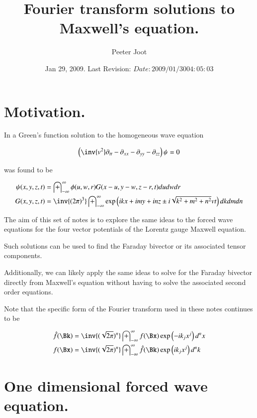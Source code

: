 \documentclass{article}
\title{ Fourier transform solutions to Maxwell's equation. }
\author{Peeter Joot}
\date{ Jan 29, 2009.  Last Revision: $Date: 2009/01/30 04:05:03 $ }
\newcommand{\IIinf}[0]{ \int_{-\infty}^\infty }
\begin{document}
\maketitle{}

\tableofcontents
\section{ Motivation. }

In \cite{PJwaveFourier} a Green's function solution to the homogeneous 
wave equation

\begin{align}\label{eqn:wave}
\left(\inv{v^2} \partial_{tt} -\partial_{xx} -\partial_{yy} -\partial_{zz} \right)\psi = 0 
\end{align}

was found to be

\begin{align}\label{eqn:greensSolution3d}
{\psi}(x,y,z,t) &= \IIinf \phi(u,w,r) G( x-u, y-w, z-r, t) du dw dr \\
G(x,y,z,t) &= \inv{({2\pi})^3} \IIinf \exp\left( i k x + i m y + i n z \pm i \sqrt{k^2 + m^2 + n^2} v t \right) dk dm dn
\end{align}

The aim of this set of notes is to explore the same ideas to the forced wave
equations for the four vector potentials of the Lorentz gauge Maxwell equation.

Such solutions can be used to find the Faraday bivector or its associated
tensor components.

Additionally, we can likely apply the same ideas to solve for the Faraday
bivector directly from Maxwell's equation without having to solve the 
associated second order equations.

Note that the specific form of the Fourier transform used in these notes continues to be

\begin{align}
\hat{f}(\Bk) &= \inv{(\sqrt{2\pi})^n} \IIinf f(\Bx) \exp\left( -i k_j x^j \right) d^n x \\
{f}(\Bx) &= \inv{(\sqrt{2\pi})^n} \IIinf \hat{f}(\Bk) \exp\left( i k_j x^j \right) d^n k
\end{align}

\section{ One dimensional forced wave equation. }
\end{document}
